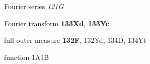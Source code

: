 



Fourier series {\it 121G}



Fourier transform {\bf 133Xd}, {\bf 133Yc}



























































full outer measure {\bf 132F}, 132Yd, 134D, 134Yt











function 1A1B








\indexmedskip














